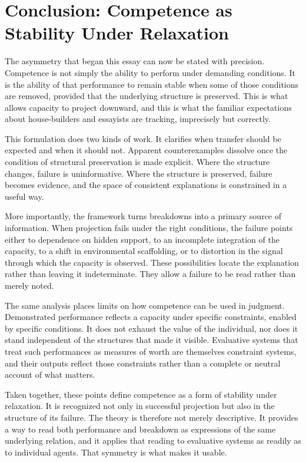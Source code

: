 \documentclass[12pt, a4paper]{article}
\begin{document}
\section{Conclusion: Competence as Stability Under Relaxation}

The asymmetry that began this essay can now be stated with precision. Competence is not simply the ability to perform under demanding conditions. It is the ability of that performance to remain stable when some of those conditions are removed, provided that the underlying structure is preserved. This is what allows capacity to project downward, and this is what the familiar expectations about house-builders and essayists are tracking, imprecisely but correctly.

This formulation does two kinds of work. It clarifies when transfer should be expected and when it should not. Apparent counterexamples dissolve once the condition of structural preservation is made explicit. Where the structure changes, failure is uninformative. Where the structure is preserved, failure becomes evidence, and the space of consistent explanations is constrained in a useful way.

More importantly, the framework turns breakdowns into a primary source of information. When projection fails under the right conditions, the failure points either to dependence on hidden support, to an incomplete integration of the capacity, to a shift in environmental scaffolding, or to distortion in the signal through which the capacity is observed. These possibilities locate the explanation rather than leaving it indeterminate. They allow a failure to be read rather than merely noted.

The same analysis places limits on how competence can be used in judgment. Demonstrated performance reflects a capacity under specific constraints, enabled by specific conditions. It does not exhaust the value of the individual, nor does it stand independent of the structures that made it visible. Evaluative systems that treat such performances as measures of worth are themselves constraint systems, and their outputs reflect those constraints rather than a complete or neutral account of what matters.

Taken together, these points define competence as a form of stability under relaxation. It is recognized not only in successful projection but also in the structure of its failure. The theory is therefore not merely descriptive. It provides a way to read both performance and breakdown as expressions of the same underlying relation, and it applies that reading to evaluative systems as readily as to individual agents. That symmetry is what makes it usable.
\end{document}
